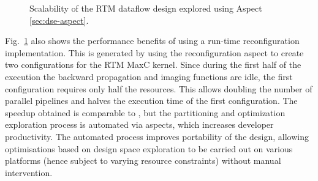 \begin{figure}[!h]
  \centering
  \caption{Scalability of the RTM dataflow design explored using Aspect \ref{sec:dse-aspect}.}
  \label{fig:scalability}
\end{figure}

Fig.~\ref{fig:scalability} also shows the performance benefits of
using a run-time reconfiguration implementation. This is generated by
using the reconfiguration aspect to create two configurations for the
RTM MaxC kernel. Since during the first half of the execution the
backward propagation and imaging functions are idle, the first
configuration requires only half the resources. This allows doubling
the number of parallel pipelines and halves the execution time of the
first configuration. The speedup obtained is comparable to
\cite{Xinyu:Qiwei:Luk:Qiang:Pell:2012}, but the partitioning and
optimization exploration process is automated via aspects, which
increases developer productivity. The automated process improves
portability of the design, allowing optimisations based on design
space exploration to be carried out on various platforms (hence
subject to varying resource constraints) without manual intervention.
